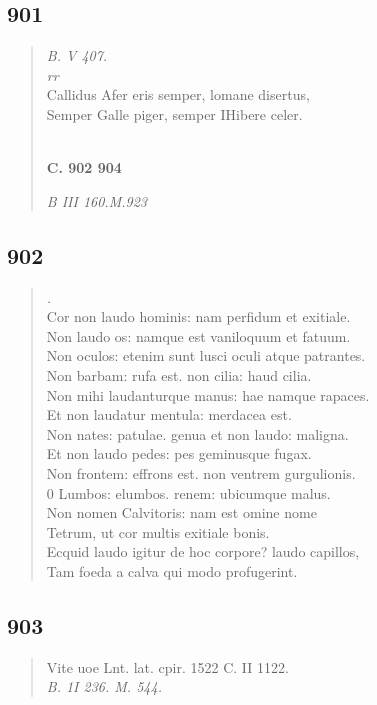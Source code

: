 \documentclass[11pt, a4paper]{report}
\begin{document}
            \subsection*{901}
      \begin{verse}
      \textit{B. V 407.} \\ \textit{rr} \\ Callidus Afer eris semper, lomane disertus, \\ Semper Galle piger, semper IHibere celer. \\ 
        ﻿\pagebreak 
     \marginpar{[341]} \begin{center} \textbf{C. 902 904} \end{center}\textit{B III 160.M.923} \\ 
      \end{verse}
  
            \subsection*{902}
      \begin{verse}
      \textit{.} \\ Cor non laudo hominis: nam perfidum et exitiale. \\ Non laudo os: namque est vaniloquum et fatuum. \\ Non oculos: etenim sunt lusci oculi atque patrantes. \\ Non barbam: rufa est. non cilia: haud cilia. \\ Non mihi laudanturque manus: hae namque rapaces. \\ Et non laudatur mentula: merdacea est. \\ Non nates: patulae. genua et non laudo: maligna. \\ Et non laudo pedes: pes geminusque fugax. \\ Non frontem: effrons est. non ventrem gurgulionis. \\ 0 Lumbos: elumbos. renem: ubicumque malus. \\ Non nomen Calvitoris: nam est omine nome \\ Tetrum, ut cor multis exitiale bonis. \\ Ecquid laudo igitur de hoc corpore? laudo capillos, \\ Tam foeda a calva qui modo profugerint. \\ 
      \end{verse}
  
            \subsection*{903}
      \begin{verse}
      Vite uoe Lnt. lat. cpir. 1522 C. II 1122. \\ \textit{B. 1I 236. M. 544.} \\ 
      \end{verse}
  
\end{document}

